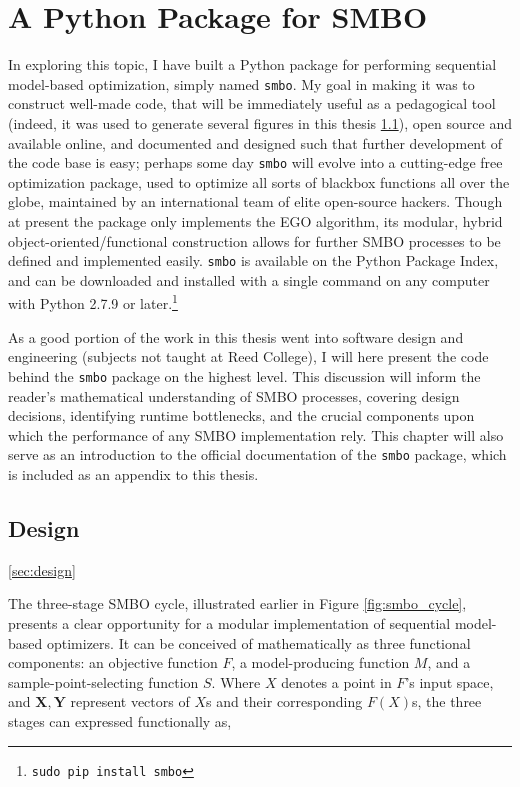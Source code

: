 \chapter{A Python Package for SMBO} \label{ch:code}


In exploring this topic, I have built a Python package for performing sequential model-based optimization, simply named \texttt{smbo}. My goal in making it was to construct well-made code, that will be immediately useful as a pedagogical tool (indeed, it was used to generate several figures in this thesis \ref{}), open source and available online, and documented and designed such that further development of the code base is easy; perhaps some day \texttt{smbo} will evolve into a cutting-edge free optimization package, used to optimize all sorts of blackbox functions all over the globe, maintained by an international team of elite open-source hackers. Though at present the package only implements the EGO algorithm, its modular, hybrid object-oriented/functional construction allows for further SMBO processes to be defined and implemented easily. \texttt{smbo} is available on the Python Package Index, and can be downloaded and installed with a single command on any computer with Python 2.7.9 or later.\footnote{\texttt{sudo pip install smbo}}

As a good portion of the work in this thesis went into software design and engineering (subjects not taught at Reed College), I will here present the code behind the \texttt{smbo} package on the highest level. This discussion will inform the reader's mathematical understanding of SMBO processes, covering design decisions, identifying runtime bottlenecks, and the crucial components upon which the performance of any SMBO implementation rely. This chapter will also serve as an introduction to the official documentation of the \texttt{smbo} package, which is included as an appendix to this thesis.

\section{Design}\ref{sec:design}

The three-stage SMBO cycle, illustrated earlier in Figure \ref{fig:smbo_cycle}, presents a clear opportunity for a modular implementation of sequential model-based optimizers. It can be conceived of mathematically as three functional components: an objective function $F$, a model-producing function $M$, and a sample-point-selecting function $S$. Where $X$ denotes a point in $F$'s input space, and $\mathbf{X},\mathbf{Y}$ represent vectors of $X$s and their corresponding $F(X)$s, the three stages can expressed functionally as,

